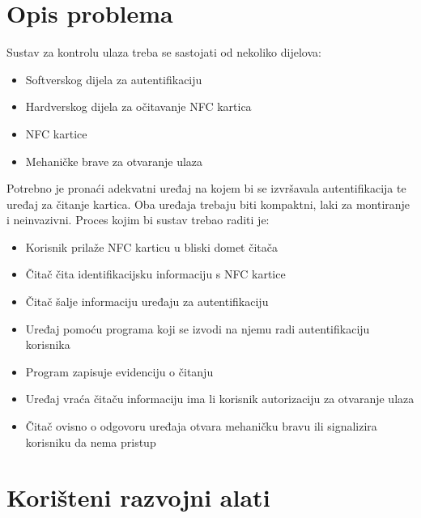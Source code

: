 \documentclass[times, utf8, zavrsni]{fer}
\begin{document}
\chapter{Opis problema}
Sustav za kontrolu ulaza treba se sastojati od nekoliko dijelova:

\begin{itemize}
\item Softverskog dijela za autentifikaciju
\item Hardverskog dijela za očitavanje NFC kartica
\item NFC kartice 
\item Mehaničke brave za otvaranje ulaza
\end{itemize}
Potrebno je pronaći adekvatni uređaj na kojem bi se izvršavala autentifikacija te uređaj za čitanje kartica. Oba uređaja trebaju biti kompaktni, laki za montiranje i neinvazivni.
\newline
Proces kojim bi sustav trebao raditi je:

\begin{itemize}
\item Korisnik prilaže NFC karticu u bliski domet čitača
\item Čitač čita identifikacijsku informaciju s NFC kartice
\item Čitač šalje informaciju uređaju za autentifikaciju
\item Uređaj pomoću programa koji se izvodi na njemu radi autentifikaciju korisnika
\item Program zapisuje evidenciju o čitanju
\item Uređaj vraća čitaču informaciju ima li korisnik autorizaciju za otvaranje ulaza
\item Čitač ovisno o odgovoru uređaja otvara mehaničku bravu ili signalizira korisniku da nema pristup
\end{itemize}

\chapter{Korišteni razvojni alati}
\end{document}

